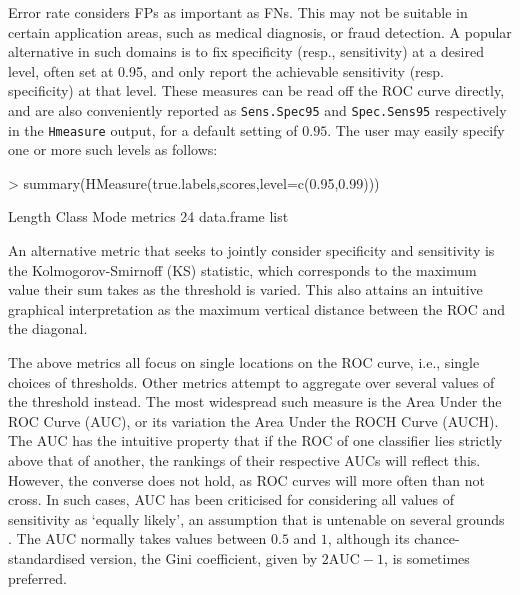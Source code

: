 \documentclass{article}
\begin{document}
Error rate considers FPs as important as FNs. This may not be suitable in certain application areas, such as medical diagnosis, or fraud detection. A popular alternative in such domains is to fix specificity (resp., sensitivity) at a desired level, often set at 0.95, and only report the achievable sensitivity (resp. specificity) at that level. These measures can be read off the ROC curve directly, and are also conveniently reported as \verb+Sens.Spec95+ and \verb+Spec.Sens95+ respectively in the \verb+Hmeasure+ output, for a default setting of $0.95$. The user may easily specify one or more such levels as follows:
\begin{Schunk}
\begin{Sinput}
> summary(HMeasure(true.labels,scores,level=c(0.95,0.99)))
\end{Sinput}
\begin{Soutput}
        Length Class      Mode
metrics 24     data.frame list
\end{Soutput}
\end{Schunk}

An alternative metric that seeks to jointly consider specificity and sensitivity is the Kolmogorov-Smirnoff (KS) statistic, which corresponds to the maximum value their sum takes as the threshold is varied. This also attains an intuitive graphical interpretation as the maximum vertical distance between the ROC and the diagonal. 

The above metrics all focus on single locations on the ROC curve, i.e., single choices of thresholds. Other metrics attempt to aggregate over several values of the threshold instead. The most widespread such measure is the Area Under the ROC Curve (AUC), or its variation the Area Under the ROCH Curve (AUCH). The AUC has the intuitive property that if the ROC of one classifier lies strictly above that of another, the rankings of their respective AUCs will reflect this. However, the converse does not hold, as ROC curves will more often than not cross. In such cases, AUC has been criticised for considering all values of sensitivity as `equally likely', an assumption that is untenable on several grounds \cite{hand2009}. The AUC normally takes values between $0.5$ and $1$, although its chance-standardised version, the Gini coefficient, given by $2\text{AUC} -1$, is sometimes preferred.
\end{document}
